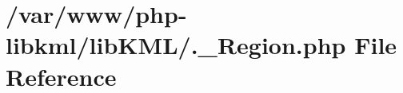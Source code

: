 \hypertarget{_8__Region_8php}{
\section{/var/www/php-\/libkml/libKML/.\_\-Region.php File Reference}
\label{dc/dc5/_8__Region_8php}
}
